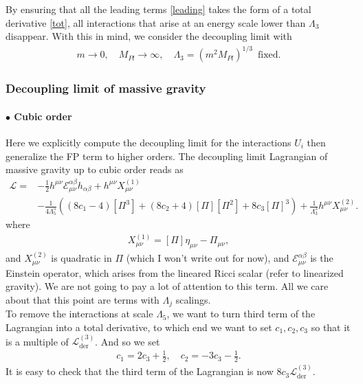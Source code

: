 \documentclass{book}
\theoremstyle{definition}
\newcommand{\lag}{\mathcal{L}}
\newcommand{\nn}{\nonumber}
\newcommand{\al}{\alpha}
\newcommand{\be}{\beta}
\newcommand{\f}[2]{\frac{#1}{#2}}
\newcommand{\lp}{\left(}
\newcommand{\rp}{\right)}
\begin{document}
By ensuring that all the leading terms  \eqref{leading} takes the form of a total derivative \eqref{tot}, all interactions that arise at an energy scale lower than $\Lambda_3$ disappear. With this in mind, we consider the decoupling limit with
\begin{align}
m\to 0,\quad M_{Pl} \to \infty, \quad \Lambda_3 = (m^2 M_{Pl})^{1/3}\, \text{ fixed.}
\end{align}















\newpage
\subsubsection{Decoupling limit of massive gravity}
\paragraph{$\bullet$ Cubic order}
Here we explicitly compute the decoupling limit for the interactions $U_i$ then generalize the FP term to higher orders. The decoupling limit Lagrangian of massive gravity up to cubic order reads as
\begin{align}
\lag = &-\f{1}{2}h^{\mu\nu}\mathcal{E}_{\mu\nu}^{\al\be}h_{\al\be} + h^{\mu\nu}X_{\mu\nu}^{(1)}\nn\\
& - \f{1}{4\Lambda_5^5}\lp (8c_1 - 4)[\Pi^3] + (8 c_2 + 4)[\Pi][\Pi^2] + 8c_3[\Pi]^3 \rp + \f{1}{\Lambda_3^3}h^{\mu\nu}X^{(2)}_{\mu\nu}.
\end{align}
where
\begin{align}
X_{\mu\nu}^{(1)} = [\Pi]\eta_{\mu\nu} - \Pi_{\mu\nu},
\end{align}
and $X_{\mu\nu}^{(2)}$ is quadratic in $\Pi$ (which I won't write out for now), and $\mathcal{E}_{\mu\nu}^{\al\be}$ is the Einstein operator, which arises from the lineared Ricci scalar (refer to linearized gravity). We are not going to pay a lot of attention to this term. All we care about that this point are terms with $\Lambda_j$ scalings. \\

To remove the interactions at scale $\Lambda_5$, we want to turn third term of the Lagrangian into a total derivative, to which end we want to set $c_1,c_2,c_3$ so that it is a multiple of $\lag^{(3)}_{\text{der}}$. And so we set
\begin{align}
c_1 = 2c_3 + \f{1}{2}, \quad c_2 = -3c_3 - \f{1}{2}.
\end{align}
It is easy to check that the third term of the Lagrangian is now $8c_3\lag^{(3)}_{\text{der}}$. \\
\end{document}
